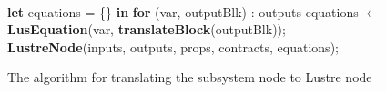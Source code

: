\documentclass{article}
\begin{document}
\begin{figure}
\begin{algorithmic}
\\
\State \textbf{let} equations = \{\} \textbf{in}
\State \textbf{for} (var, outputBlk) : outputs
\State {\ \ \ \ } equations $\leftarrow$ \textbf{LusEquation}(var, \textbf{translateBlock}(outputBlk));
\State \textbf{LustreNode}(inputs, outputs, props, contracts, equations);
\EndFunction
\end{algorithmic}
\label{node}
\caption{The algorithm for translating the subsystem node to Lustre node}
\end{figure}
\end{document}
